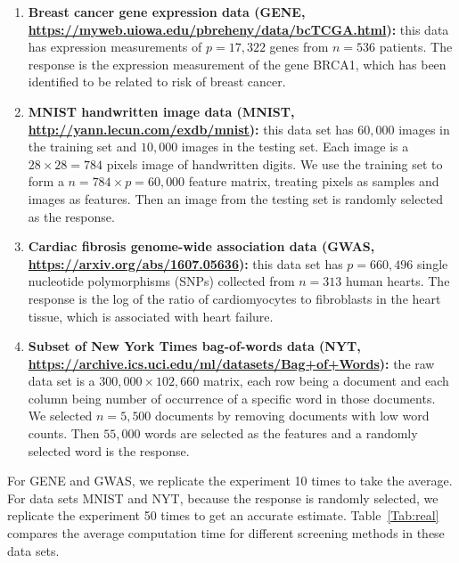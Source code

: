 \documentclass[]{interact}
\theoremstyle{plain}%
\theoremstyle{definition}
\theoremstyle{remark}
\begin{document}
\begin{enumerate}
    \item \textbf{Breast cancer gene expression data
(GENE, \url{https://myweb.uiowa.edu/pbreheny/data/bcTCGA.html}):} this data has expression measurements of $p=17,322$ genes from $n=536$ patients. The response is the expression measurement of the gene BRCA1, which has been identified to be related to risk of breast cancer.
    \item \textbf{MNIST handwritten image data
(MNIST, \url{http://yann.lecun.com/exdb/mnist}):} this data set has $60,000$ images in the training set and $10,000$ images in the testing set. Each image is a $28\times 28=784$ pixels image of handwritten digits. We use the training set to form a $n=784\times p=60,000$ feature matrix, treating pixels as samples and images as features. Then an image from the testing set is randomly selected as the response.
    \item \textbf{Cardiac fibrosis genome-wide association data
(GWAS, \url{https://arxiv.org/abs/1607.05636}):} this data set has $p=660,496$ single nucleotide
polymorphisms (SNPs) collected from $n=313$ human hearts. The response is the log of the ratio of cardiomyocytes to fibroblasts in the heart tissue, which is associated with heart failure.
    \item \textbf{Subset of New York Times bag-of-words data
(NYT, \url{https://archive.ics.uci.edu/ml/datasets/Bag+of+Words}):} the raw data set is a $300,000\times 102,660$ matrix, each row being a document and each column being number of occurrence of a specific word in those documents. We selected $n=5,500$ documents by removing documents with low word counts. Then $55,000$ words are selected as the features and a randomly selected word is the response.

\end{enumerate}


For GENE and GWAS, we replicate the experiment 10 times to take the average. For data sets MNIST and NYT, because the response is randomly selected, we replicate the experiment 50 times to get an accurate estimate. Table~\ref{Tab:real} compares the average computation time for different screening methods in these data sets.
\end{document}
